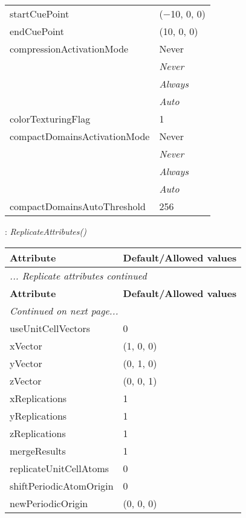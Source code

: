 \documentclass[10pt,a4paper]{report}
\begin{document}
\begin{longtable}{ll}
startCuePoint  &  ($-$10, 0, 0) \\
endCuePoint  &  (10, 0, 0) \\
compressionActivationMode  &  Never   \\
 & {\it  Never} \\
 & {\it  Always} \\
 & {\it  Auto} \\
colorTexturingFlag  &  1 \\
compactDomainsActivationMode  &  Never   \\
 & {\it  Never} \\
 & {\it  Always} \\
 & {\it  Auto} \\
compactDomainsAutoThreshold  &  256 \\
\end{longtable}

\newpage

{}
: {\it ReplicateAttributes() }\\[-3mm]

\begin{longtable}{ll}
{\bf Attribute} & {\bf Default/Allowed values} \\
\hline \hline
\endfirsthead
\multicolumn{2}{l}{{\it ... Replicate attributes continued}} \\
{\bf Attribute} & {\bf Default/Allowed values} \\
\hline \hline
\endhead
\hline
\multicolumn{2}{l}{{\it Continued on next page...}} \\
\endfoot
\hline
\endlastfoot

useUnitCellVectors  &  0 \\
xVector  &  (1, 0, 0) \\
yVector  &  (0, 1, 0) \\
zVector  &  (0, 0, 1) \\
xReplications  &  1 \\
yReplications  &  1 \\
zReplications  &  1 \\
mergeResults  &  1 \\
replicateUnitCellAtoms  &  0 \\
shiftPeriodicAtomOrigin  &  0 \\
newPeriodicOrigin  &  (0, 0, 0) \\
\end{longtable}

\newpage
\end{document}
